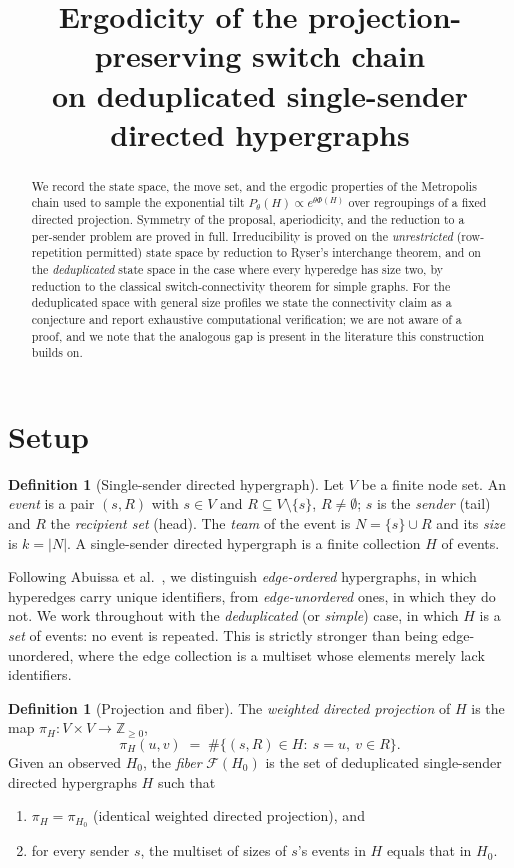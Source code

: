 \documentclass[11pt]{article}
\title{Ergodicity of the projection-preserving switch chain\\
on deduplicated single-sender directed hypergraphs}
\author{}
\date{}
\theoremstyle{definition}
\newtheorem{definition}[theorem]{Definition}
\newcommand{\Fcal}{\mathcal{F}}
\begin{document}
\maketitle

\begin{abstract}
We record the state space, the move set, and the ergodic properties of the
Metropolis chain used to sample the exponential tilt $P_\theta(H)\propto
e^{\theta\Phi(H)}$ over regroupings of a fixed directed projection. Symmetry of
the proposal, aperiodicity, and the reduction to a per-sender problem are proved
in full. Irreducibility is proved on the \emph{unrestricted} (row-repetition
permitted) state space by reduction to Ryser's interchange theorem, and on the
\emph{deduplicated} state space in the case where every hyperedge has size two,
by reduction to the classical switch-connectivity theorem for simple graphs. For
the deduplicated space with general size profiles we state the connectivity
claim as a conjecture and report exhaustive computational verification; we are
not aware of a proof, and we note that the analogous gap is present in the
literature this construction builds on.
\end{abstract}

\section{Setup}

\begin{definition}[Single-sender directed hypergraph]
Let $V$ be a finite node set. An \emph{event} is a pair $(s,R)$ with $s\in V$
and $R\subseteq V\setminus\{s\}$, $R\neq\emptyset$; $s$ is the \emph{sender}
(tail) and $R$ the \emph{recipient set} (head). The \emph{team} of the event is
$N=\{s\}\cup R$ and its \emph{size} is $k=|N|$. A single-sender directed
hypergraph is a finite collection $H$ of events.
\end{definition}

Following Abuissa et al.~\cite{dinghy}, we distinguish \emph{edge-ordered}
hypergraphs, in which hyperedges carry unique identifiers, from
\emph{edge-unordered} ones, in which they do not. We work throughout with the
\emph{deduplicated} (or \emph{simple}) case, in which $H$ is a \emph{set} of
events: no event is repeated. This is strictly stronger than being
edge-unordered, where the edge collection is a multiset whose elements merely
lack identifiers.

\begin{definition}[Projection and fiber]
The \emph{weighted directed projection} of $H$ is the map
$\pi_H:V\times V\to\mathbb{Z}_{\ge0}$,
\[
  \pi_H(u,v)\;=\;\#\{(s,R)\in H:\ s=u,\ v\in R\}.
\]
Given an observed $H_0$, the \emph{fiber} $\Fcal(H_0)$ is the set of
deduplicated single-sender directed hypergraphs $H$ such that
\begin{enumerate}
\item[(F1)] $\pi_H=\pi_{H_0}$ (identical weighted directed projection), and
\item[(F2)] for every sender $s$, the multiset of sizes of $s$'s events in $H$
equals that in $H_0$.
\end{enumerate}
\end{definition}
\end{document}
